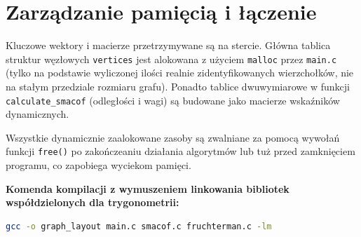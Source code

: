 \documentclass[12pt,a4paper]{article}
\begin{document}
\section{Zarządzanie pamięcią i łączenie}
Kluczowe wektory i macierze przetrzymywane są na stercie. Główna tablica struktur węzłowych \texttt{vertices} jest alokowana z użyciem \texttt{malloc} przez \texttt{main.c} (tylko na podstawie wyliczonej ilości realnie zidentyfikowanych wierzchołków, nie na stałym przedziale rozmiaru grafu). Ponadto tablice dwuwymiarowe w funkcji \texttt{calculate\_smacof} (odległości i wagi) są budowane jako macierze wskaźników dynamicznych.

Wszystkie dynamicznie zaalokowane zasoby są zwalniane za pomocą wywołań funkcji \texttt{free()} po zakończeaniu działania algorytmów lub tuż przed zamknięciem programu, co zapobiega wyciekom pamięci.

\textbf{Komenda kompilacji z wymuszeniem linkowania bibliotek współdzielonych dla trygonometrii:}
\begin{lstlisting}[language=bash]
gcc -o graph_layout main.c smacof.c fruchterman.c -lm
\end{lstlisting}
\end{document}
